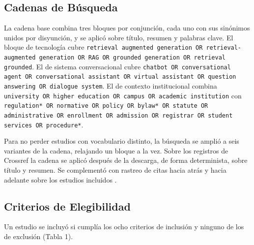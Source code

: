 \documentclass[man,12pt,floatsintext,donotrepeattitle]{apa7}
\begin{document}
\subsection{Cadenas de Búsqueda}
La cadena base combina tres bloques por conjunción, cada uno con sus sinónimos unidos por disyunción, y se aplicó sobre título, resumen y palabras clave. El bloque de tecnología cubre \texttt{\textquotedbl{}retrieval augmented generation\textquotedbl{} OR \textquotedbl{}retrieval-augmented generation\textquotedbl{} OR RAG OR \textquotedbl{}grounded generation\textquotedbl{} OR \textquotedbl{}retrieval grounded\textquotedbl{}}. El de sistema conversacional cubre \texttt{chatbot OR \textquotedbl{}conversational agent\textquotedbl{} OR \textquotedbl{}conversational assistant\textquotedbl{} OR \textquotedbl{}virtual assistant\textquotedbl{} OR \textquotedbl{}question answering\textquotedbl{} OR \textquotedbl{}dialogue system\textquotedbl{}}. El de contexto institucional combina \texttt{university OR \textquotedbl{}higher education\textquotedbl{} OR campus OR \textquotedbl{}academic institution\textquotedbl{}} con \texttt{regulation* OR normative OR policy OR bylaw* OR statute OR administrative OR enrollment OR admission OR registrar OR \textquotedbl{}student services\textquotedbl{} OR procedure*}.

Para no perder estudios con vocabulario distinto, la búsqueda se amplió a seis variantes de la cadena, relajando un bloque a la vez. Sobre los registros de Crossref la cadena se aplicó después de la descarga, de forma determinista, sobre título y resumen. Se complementó con rastreo de citas hacia atrás y hacia adelante sobre los estudios incluidos \parencite{wohlin2014}.

\subsection{Criterios de Elegibilidad}
Un estudio se incluyó si cumplía los ocho criterios de inclusión y ninguno de los de exclusión (Tabla 1).
\end{document}
